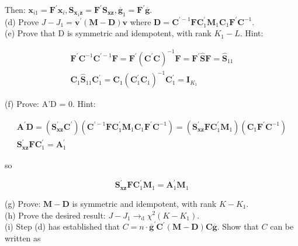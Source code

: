 \documentclass[10pt]{article}
\begin{document}
Then: $\mathbf{x}_{i 1}=\mathbf{F}^{\prime} \mathbf{x}_{i}, \mathbf{S}_{\mathbf{x}_{1} \mathbf{z}}=\mathbf{F}^{\prime} \mathbf{S}_{\mathbf{x z}}, \overline{\mathbf{g}}_{1}=\mathbf{F}^{\prime} \overline{\mathbf{g}}$.\\
(d) Prove $J-J_{1}=\mathbf{v}^{\prime}(\mathbf{M}-\mathbf{D}) \mathbf{v}$ where $\mathbf{D}=\mathbf{C}^{\prime-1} \mathbf{F C}_{1}^{\prime} \mathbf{M}_{1} \mathbf{C}_{1} \mathbf{F}^{\prime} \mathbf{C}^{-1}$.\\
(e) Prove that D is symmetric and idempotent, with rank $K_{1}-L$. Hint:

$$
\begin{gathered}
\mathbf{F}^{\prime} \mathbf{C}^{-1} \mathbf{C}^{\prime-1} \mathbf{F}=\mathbf{F}^{\prime}\left(\mathbf{C}^{\prime} \mathbf{C}\right)^{-1} \mathbf{F}=\mathbf{F}^{\prime} \widehat{\mathbf{S}} \mathbf{F}=\widehat{\mathbf{S}}_{11} \\
\mathbf{C}_{1} \widehat{\mathbf{S}}_{11} \mathbf{C}_{1}^{\prime}=\mathbf{C}_{1}\left(\mathbf{C}_{1}^{\prime} \mathbf{C}_{1}\right)^{-1} \mathbf{C}_{1}^{\prime}=\mathbf{I}_{K_{1}}
\end{gathered}
$$

(f) Prove: A'D = 0. Hint:

$$
\begin{gathered}
\mathbf{A}^{\prime} \mathbf{D}=\left(\mathbf{S}_{\mathbf{x z}}^{\prime} \mathbf{C}^{\prime}\right)\left(\mathbf{C}^{\prime-1} \mathbf{F C}_{1}^{\prime} \mathbf{M}_{1} \mathbf{C}_{1} \mathbf{F}^{\prime} \mathbf{C}^{-1}\right)=\left(\mathbf{S}_{\mathbf{x z}}^{\prime} \mathbf{F C}_{1}^{\prime} \mathbf{M}_{1}\right)\left(\mathbf{C}_{1} \mathbf{F}^{\prime} \mathbf{C}^{-1}\right) \\
\mathbf{S}_{\mathbf{x z}}^{\prime} \mathbf{F C}_{1}^{\prime}=\mathbf{A}_{1}^{\prime}
\end{gathered}
$$

so

$$
\mathbf{S}_{\mathbf{x z}}^{\prime} \mathbf{F C}_{1}^{\prime} \mathbf{M}_{1}=\mathbf{A}_{1}^{\prime} \mathbf{M}_{1}
$$

(g) Prove: $\mathbf{M}-\mathbf{D}$ is symmetric and idempotent, with rank $K-K_{1}$.\\
(h) Prove the desired result: $J-J_{1} \rightarrow_{\mathrm{d}} \chi^{2}\left(K-K_{1}\right)$.\\
(i) Step (d) has established that $C=n \cdot \overline{\mathbf{g}}^{\prime} \mathbf{C}^{\prime}(\mathbf{M}-\mathbf{D}) \mathbf{C} \overline{\mathbf{g}}$. Show that $C$ can be written as
\end{document}
